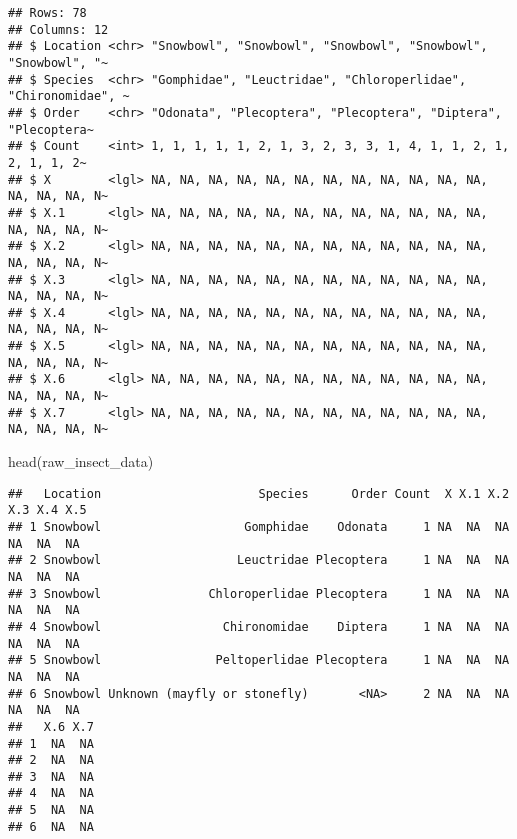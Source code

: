 \documentclass[
]{article}
\newenvironment{Shaded}{\begin{snugshade}}{\end{snugshade}}
\newcommand{\FunctionTok}[1]{\textcolor[rgb]{0.00,0.00,0.00}{#1}}
\newcommand{\NormalTok}[1]{#1}
\begin{document}
\begin{verbatim}
## Rows: 78
## Columns: 12
## $ Location <chr> "Snowbowl", "Snowbowl", "Snowbowl", "Snowbowl", "Snowbowl", "~
## $ Species  <chr> "Gomphidae", "Leuctridae", "Chloroperlidae", "Chironomidae", ~
## $ Order    <chr> "Odonata", "Plecoptera", "Plecoptera", "Diptera", "Plecoptera~
## $ Count    <int> 1, 1, 1, 1, 1, 2, 1, 3, 2, 3, 3, 1, 4, 1, 1, 2, 1, 2, 1, 1, 2~
## $ X        <lgl> NA, NA, NA, NA, NA, NA, NA, NA, NA, NA, NA, NA, NA, NA, NA, N~
## $ X.1      <lgl> NA, NA, NA, NA, NA, NA, NA, NA, NA, NA, NA, NA, NA, NA, NA, N~
## $ X.2      <lgl> NA, NA, NA, NA, NA, NA, NA, NA, NA, NA, NA, NA, NA, NA, NA, N~
## $ X.3      <lgl> NA, NA, NA, NA, NA, NA, NA, NA, NA, NA, NA, NA, NA, NA, NA, N~
## $ X.4      <lgl> NA, NA, NA, NA, NA, NA, NA, NA, NA, NA, NA, NA, NA, NA, NA, N~
## $ X.5      <lgl> NA, NA, NA, NA, NA, NA, NA, NA, NA, NA, NA, NA, NA, NA, NA, N~
## $ X.6      <lgl> NA, NA, NA, NA, NA, NA, NA, NA, NA, NA, NA, NA, NA, NA, NA, N~
## $ X.7      <lgl> NA, NA, NA, NA, NA, NA, NA, NA, NA, NA, NA, NA, NA, NA, NA, N~
\end{verbatim}

\begin{Shaded}
\begin{Highlighting}[]
\FunctionTok{head}\NormalTok{(raw\_insect\_data)}
\end{Highlighting}
\end{Shaded}

\begin{verbatim}
##   Location                      Species      Order Count  X X.1 X.2 X.3 X.4 X.5
## 1 Snowbowl                    Gomphidae    Odonata     1 NA  NA  NA  NA  NA  NA
## 2 Snowbowl                   Leuctridae Plecoptera     1 NA  NA  NA  NA  NA  NA
## 3 Snowbowl               Chloroperlidae Plecoptera     1 NA  NA  NA  NA  NA  NA
## 4 Snowbowl                 Chironomidae    Diptera     1 NA  NA  NA  NA  NA  NA
## 5 Snowbowl                Peltoperlidae Plecoptera     1 NA  NA  NA  NA  NA  NA
## 6 Snowbowl Unknown (mayfly or stonefly)       <NA>     2 NA  NA  NA  NA  NA  NA
##   X.6 X.7
## 1  NA  NA
## 2  NA  NA
## 3  NA  NA
## 4  NA  NA
## 5  NA  NA
## 6  NA  NA
\end{verbatim}
\end{document}
